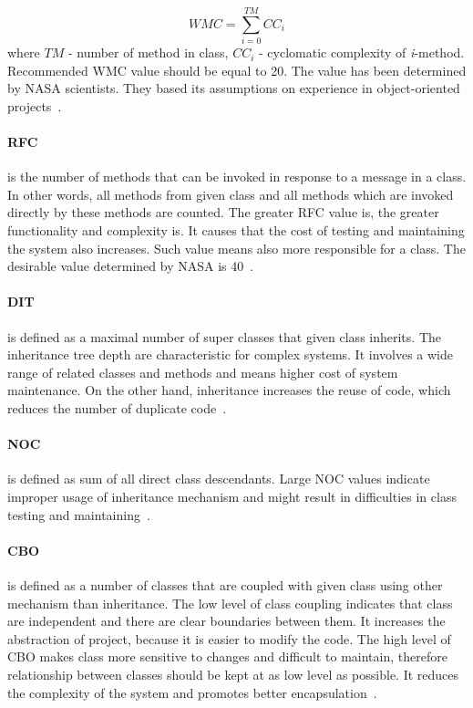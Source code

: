 \begin{equation}
WMC=\sum _{ i=0 }^{ TM }{ { CC }_{ i } } 
\end{equation}
where $TM$ - number of method in class, $CC_{i}$ - cyclomatic complexity of \textit{i}-method. Recommended \ac{WMC} value should be equal to 20. The value has been determined by NASA scientists. They based its assumptions on experience in object-oriented projects~\cite{nasa}.

\paragraph{\ac{RFC}} is the number of methods that can be invoked in response to a message in a class. In other words, all methods from given class and all methods which are invoked directly by these methods are counted. The greater \ac{RFC} value is, the greater functionality and complexity is. It causes that the cost of testing and maintaining the system also increases. Such value means also more responsible for a class. The desirable value determined by NASA is 40~\cite{nasa}.

\paragraph{\ac{DIT}} is defined as a maximal number of super classes that given class inherits.  The inheritance tree depth are characteristic for complex systems. It involves a wide range of related classes and methods and means higher cost of system maintenance. On the other hand, inheritance increases the reuse of code, which reduces the number of duplicate code~\cite{nasa}.

\paragraph{\ac{NOC}} is defined as sum of all direct class descendants. Large \ac{NOC} values indicate improper usage of inheritance mechanism and might result in difficulties in class testing and maintaining~\cite{nasa}.  

\paragraph{\ac{CBO}} is defined as a number of classes that are coupled with given class using other mechanism than inheritance. The low level of class coupling indicates that class are independent and there are clear boundaries between them. It increases the abstraction of project, because it is easier to modify the code. The high level of \ac{CBO} makes class more sensitive to changes and difficult to maintain, therefore relationship between classes should be kept at as low level as possible. It reduces the complexity of the system and promotes better encapsulation~\cite{nasa}. 

